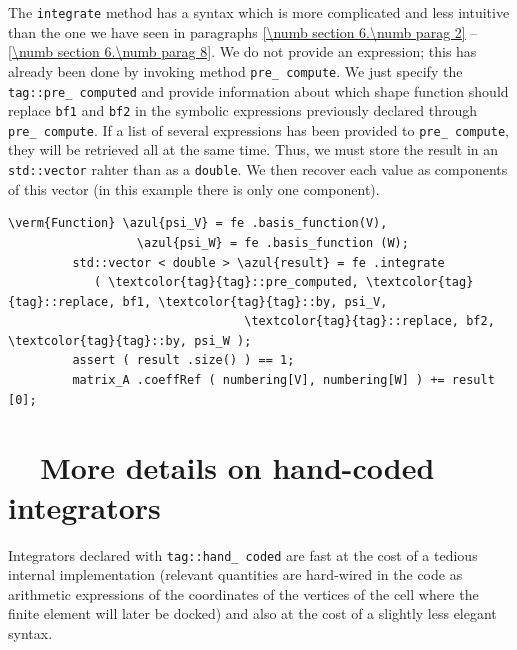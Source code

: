The {\small\tt integrate} method has a syntax which is more complicated and less intuitive
than the one we have seen in paragraphs \ref{\numb section 6.\numb parag 2} --
\ref{\numb section 6.\numb parag 8}.
We do not provide an expression; this has already been done by invoking method
{\small\tt pre\_\,compute}.
We just specify the {\small\tt\textcolor{tag}{tag}::pre\_\,computed} and provide
information about which shape function should replace {\small\tt bf1} and {\small\tt bf2}
in the symbolic expressions previously declared through {\small\tt pre\_\,compute}.
If a list of several expressions has been provided to {\small\tt pre\_\,compute},
they will be retrieved all at the same time.
Thus, we must store the result in an {\small\tt std::vector} rahter than as a {\small\tt double}.
We then recover each value as components of this vector (in this example there is only
one component).

\begin{Verbatim}[commandchars=\\\{\},formatcom=\small\tt,frame=single,
   label=parag-\ref{\numb section 6.\numb parag 9}.cpp,rulecolor=\color{moldura},
   baselinestretch=0.94,framesep=2mm                                            ]
         \verm{Function} \azul{psi_V} = fe .basis_function(V),
                  \azul{psi_W} = fe .basis_function (W);
         std::vector < double > \azul{result} = fe .integrate 
            ( \textcolor{tag}{tag}::pre_computed, \textcolor{tag}{tag}::replace, bf1, \textcolor{tag}{tag}::by, psi_V,
                                 \textcolor{tag}{tag}::replace, bf2, \textcolor{tag}{tag}::by, psi_W );
         assert ( result .size() ) == 1;
         matrix_A .coeffRef ( numbering[V], numbering[W] ) += result [0];
\end{Verbatim}

\section{~~More details on hand-coded integrators}\label{\numb section 6.\numb parag 10}

Integrators declared with {\small\tt\textcolor{tag}{tag}::hand\_\,coded} are fast at the
cost of a tedious internal implementation (relevant quantities are hard-wired in the code
as arithmetic expressions of the coordinates of the vertices of the cell where the
finite element will later be docked) and also at the cost of a slightly less elegant syntax.

